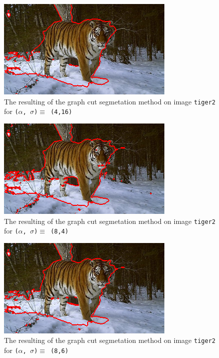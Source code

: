 {  \begin{minipage}{0.45\linewidth}
    \begin{figure}[H]
      \includegraphics[scale=0.5]{./images/04/Q11/var_a_b/tiger2/graphcut2_a4_s16.png}
      \caption{The resulting of the graph cut segmetation method on image \texttt{tiger2} for
        \texttt{($\alpha$, $\sigma$)$ \equiv$ (4,16)}}
      \label{fig:04_tiger22_a4_s16}
    \end{figure}
    \vfill
    \begin{figure}[H]
      \includegraphics[scale=0.5]{./images/04/Q11/var_a_b/tiger2/graphcut2_a8_s4.png}
      \caption{The resulting of the graph cut segmetation method on image \texttt{tiger2} for
        \texttt{($\alpha$, $\sigma$)$ \equiv$ (8,4)}}
      \label{fig:04_tiger22_a8_s4}
    \end{figure}
    \vfill
    \begin{figure}[H]
      \includegraphics[scale=0.5]{./images/04/Q11/var_a_b/tiger2/graphcut2_a8_s6.png}
      \caption{The resulting of the graph cut segmetation method on image \texttt{tiger2} for
        \texttt{($\alpha$, $\sigma$)$ \equiv$ (8,6)}}
      \label{fig:04_tiger22_a8_s6}
    \end{figure}
  \end{minipage}
}


